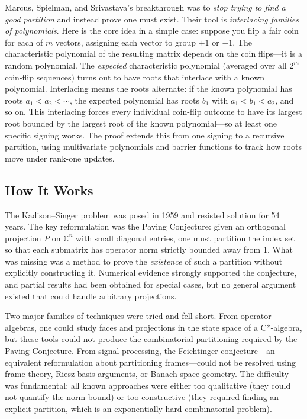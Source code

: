 Marcus, Spielman, and Srivastava's breakthrough was to \emph{stop trying to find a good partition} and instead prove one must exist. Their tool is \emph{interlacing families of polynomials}. Here is the core idea in a simple case: suppose you flip a fair coin for each of $m$ vectors, assigning each vector to group $+1$ or $-1$. The characteristic polynomial of the resulting matrix depends on the coin flips---it is a random polynomial. The \emph{expected} characteristic polynomial (averaged over all $2^m$ coin-flip sequences) turns out to have roots that interlace with a known polynomial. Interlacing means the roots alternate: if the known polynomial has roots $a_1 < a_2 < \cdots$, the expected polynomial has roots $b_1$ with $a_1 < b_1 < a_2$, and so on. This interlacing forces every individual coin-flip outcome to have its largest root bounded by the largest root of the known polynomial---so at least one specific signing works. The proof extends this from one signing to a recursive partition, using multivariate polynomials and barrier functions to track how roots move under rank-one updates.

\subsection{How It Works}

The Kadison--Singer problem was posed in 1959 and resisted solution for 54 years. The key reformulation was the Paving Conjecture: given an orthogonal projection $P$ on $\mathbb{C}^n$ with small diagonal entries, one must partition the index set so that each submatrix has operator norm strictly bounded away from 1. What was missing was a method to prove the \emph{existence} of such a partition without explicitly constructing it. Numerical evidence strongly supported the conjecture, and partial results had been obtained for special cases, but no general argument existed that could handle arbitrary projections.

Two major families of techniques were tried and fell short. From operator algebras, one could study faces and projections in the state space of a C*-algebra, but these tools could not produce the combinatorial partitioning required by the Paving Conjecture. From signal processing, the Feichtinger conjecture---an equivalent reformulation about partitioning frames---could not be resolved using frame theory, Riesz basis arguments, or Banach space geometry. The difficulty was fundamental: all known approaches were either too qualitative (they could not quantify the norm bound) or too constructive (they required finding an explicit partition, which is an exponentially hard combinatorial problem).

